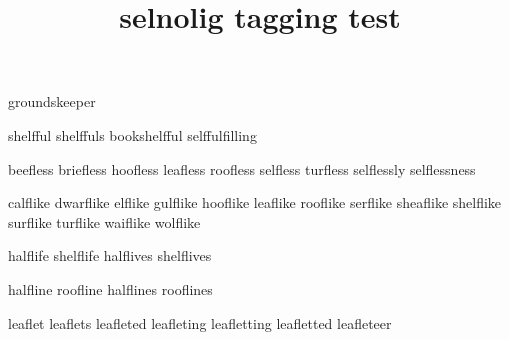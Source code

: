 \documentclass[english]{article}
\title{selnolig tagging test}
\begin{document}

grounds\breaklig keeper

shelfful shelffuls bookshelfful selffulfilling

beefless briefless hoofless leafless roofless selfless turfless selflessly selflessness

calflike dwarflike elflike gulflike hooflike leaflike rooflike serflike sheaflike shelflike surflike turflike waiflike wolflike

halflife shelflife
halflives shelflives

halfline roofline
halflines rooflines

leaflet leaflets leafleted leafleting leafletting leafletted leafleteer
\end{document}
